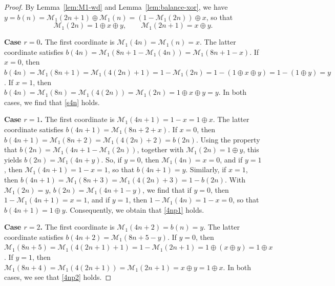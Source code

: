 \documentclass[12pt,reqno]{article}
\theoremstyle{plain}
\theoremstyle{definition}
\theoremstyle{remark}
\begin{document}
\begin{proof}
 By Lemma~\ref{lem:M1-wd} and Lemma~\ref{lem:balance-xor}, we have 
 $y = b(n) = \mathcal{M}_{1}(2n+1)\oplus \mathcal{M}_{1}(n) = (1-\mathcal{M}_{1}(2n))\oplus x$, so that
\begin{equation*}
 \mathcal{M}_{1}(2n) = 1 \oplus x \oplus y, \qquad
 \mathcal{M}_{1}(2n+1) = x \oplus y.
\end{equation*}

\textbf{Case $r = 0$.} The first coordinate is $\mathcal{M}_{1}(4n) = \mathcal{M}_{1}(n) = x$. The latter coordinate satisfies 
 $b(4n) = \mathcal{M}_{1}(8n + 1 - \mathcal{M}_{1}(4n)) = \mathcal{M}_{1}(8n + 1 - x)$. If $x = 0$, then $b(4n) = \mathcal{M}_{1}(8 n + 
 1) = \mathcal{M}_{1}(4(2n)+1) = 1 - \mathcal{M}_{1}(2n) = 1 - (1 \oplus x \oplus y) = 1 - (1 \oplus y) = y$. If $x = 1$, then $b(4n) = \mathcal{M}_{1}(8n) = 
 \mathcal{M}_{1}(4(2n)) = \mathcal{M}_{1}(2n) = 1 \oplus x \oplus y = y$. In both cases, we find that 
 \eqref{s4n} holds. 

\textbf{Case $r = 1$.} The first coordinate is $\mathcal{M}_{1}(4n+1) = 1 - x = 1 \oplus x$. The latter coordinate satisfies 
 $b(4n+1) = \mathcal{M}_{1}(8n + 2 + x)$. If $x = 0$, then $b(4n+1) = \mathcal{M}_{1}(8 n + 2) = \mathcal{M}_{1}(4(2n)+2) = b(2n)$. 
 Using the property that $b(2n) = \mathcal{M}_{1}(4n + 1 - \mathcal{M}_{1}(2n))$, together with $\mathcal{M}_{1}(2n) = 1 \oplus y$, 
 this yields $b(2n) = \mathcal{M}_{1}(4n + y)$. So, if $y = 0$, then $\mathcal{M}_{1}(4n) = x = 0$, and if $y = 1$, then 
 $\mathcal{M}_{1}(4n+1) = 
 1 - x = 1$, so that $b(4n+1) = y$. Similarly, if $x = 1$, then $b(4n+1) = \mathcal{M}_{1}(8n+3) = \mathcal{M}_{1}(4(2n)+3) = 1 - b(2n)$.
 With $\mathcal{M}_{1}(2n) = y$, $b(2n) = \mathcal{M}_{1}(4n + 1 - y)$, we find that if $y = 0$, then $1 - \mathcal{M}_{1}(4n+1) = x = 
 1$, and if $y = 1$, then $1 - \mathcal{M}_{1}(4n) = 1-x = 0$, so that $b(4n+1) = 1 \oplus y$. Consequently, we obtain that 
 \eqref{4np1} holds. 

\textbf{Case $r = 2$.} The first coordinate is $\mathcal{M}_{1}(4n+2) = b(n) = y$. The latter coordinate satisfies $b(4 n + 
 2) = \mathcal{M}_{1}(8n + 5 - y)$. If $y = 0$, then $\mathcal{M}_{1}(8n+5) = \mathcal{M}_{1}(4(2n+1)+1) = 1 - \mathcal{M}_{1}(2n+1) = 
 1 \oplus (x \oplus y) = 1 \oplus x$. If $y = 1$, then $\mathcal{M}_{1}(8n+4) = \mathcal{M}_{1}(4(2n+1)) = \mathcal{M}_{1}(2n+1) = 
 x \oplus y = 1 \oplus x$. In both cases, we see that \eqref{4np2} holds. 


\end{proof}
\end{document}
